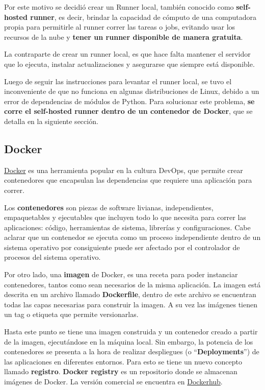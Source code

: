 Por este motivo se decidió crear un Runner local, también conocido como \textbf{self-hosted runner}, es decir, brindar la capacidad de cómputo de una computadora propia para permitirle al runner correr las tareas o jobs, evitando usar los recursos de la nube y \textbf{tener un runner disponible de manera gratuita}.

La contraparte de crear un runner local, es que hace falta mantener el servidor que lo ejecuta, instalar actualizaciones y asegurarse que siempre está disponible.

Luego de seguir las instrucciones para levantar el runner local, se tuvo el inconveniente de que no funciona en algunas distribuciones de Linux, debido a un error de dependencias de módulos de Python. Para solucionar este problema, \textbf{se corre el self-hosted runner dentro de un contenedor de Docker}, que se detalla en la siguiente sección.

\subsection{Docker}

\href{https://www.docker.com/}{Docker} es una herramienta popular en la cultura DevOps, que permite crear contenedores que encapsulan las dependencias que requiere una aplicación para correr.

Los \textbf{contenedores} son piezas de software livianas, independientes, empaquetables y ejecutables que incluyen todo lo que necesita para correr las aplicaciones: código, herramientas de sistema, librerías y configuraciones. Cabe aclarar que un contenedor se ejecuta como un proceso independiente dentro de un sistema operativo por consiguiente puede ser afectado por el controlador de procesos del sistema operativo.

Por otro lado, una \textbf{imagen} de Docker, es una receta para poder instanciar contenedores, tantos como sean necesarios de la misma aplicación. La imagen está descrita en un archivo llamado \textbf{Dockerfile}, dentro de este archivo se encuentran todas las capas necesarias para construir la imagen. A su vez las imágenes tienen un tag o etiqueta que permite versionarlas.

Hasta este punto se tiene una imagen construida y un contenedor creado a partir de la imagen, ejecutándose en la máquina local. Sin embargo, la potencia de los contenedores se presenta a la hora de realizar despliegues (o ``\textbf{Deployments}'') de las aplicaciones en diferentes entornos. Para esto se tiene un nuevo concepto llamado \textbf{registro}. \textbf{Docker registry} es un repositorio donde se almacenan imágenes de Docker. La versión comercial se encuentra en \href{https://hub.docker.com}{Dockerhub}.

